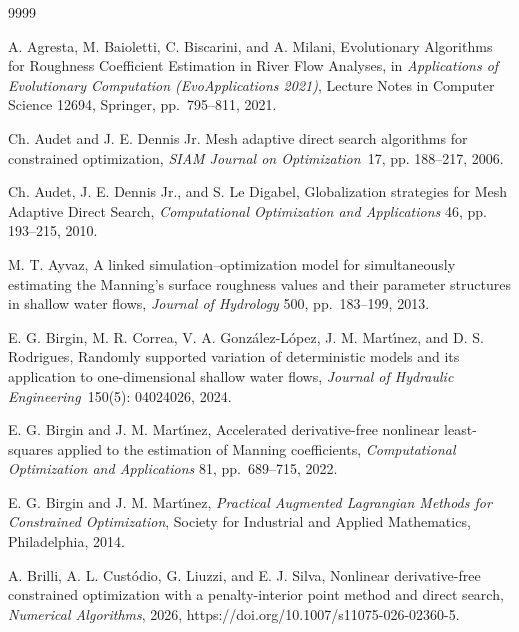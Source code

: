 \documentclass{article}
\begin{document}
    
\begin{thebibliography}{9999}

 

 A. Agresta, M. Baioletti, C. Biscarini, and A. Milani, Evolutionary Algorithms
 for Roughness Coefficient Estimation in River Flow Analyses, in {\it Applications of Evolutionary
 Computation (EvoApplications 2021)}, Lecture Notes in Computer Science 12694, Springer,
 pp.~795--811, 2021.
%
%

 Ch. Audet and J. E. Dennis Jr. {Mesh adaptive direct search algorithms 
for constrained optimization,} {\it SIAM Journal on Optimization}~17, pp. 188--217, 2006.
%

 Ch. Audet, J. E. Dennis Jr., 
and S. Le Digabel, {Globalization strategies for Mesh
 Adaptive Direct Search},  {\it Computational Optimization and Applications} 46,
 pp. 193--215, 2010.
%

  M. T. Ayvaz, A linked simulation–optimization model for simultaneously estimating 
the Manning’s surface roughness values and their parameter structures in shallow water flows, {\it Journal of Hydrology} 500, pp.~183--199, 2013.  

    E. G. Birgin, M. R. Correa, V. A. González-López, J. M.  Mart\'{\i}nez, and D. S. Rodrigues,
 Randomly supported variation of deterministic models and its application to one-dimensional shallow
water flows, {\it Journal of Hydraulic Engineering}~150(5): 04024026, 2024.

 E. G. Birgin and J. M. Mart\'{\i}nez, Accelerated derivative-free
 nonlinear least-squares applied to the estimation of Manning coefficients, {\it Computational
 Optimization and Applications} 81, pp.~689--715, 2022.


  E. G. Birgin and J. M. Mart\'{\i}nez,
  \textit{Practical Augmented Lagrangian Methods for Constrained
    Optimization}, Society for Industrial and Applied Mathematics,
  Philadelphia, 2014.

 A. Brilli, A. L. Cust\'odio, G. Liuzzi, and E. J. Silva,
   Nonlinear derivative-free constrained optimization with a penalty-interior point method and
   direct search, {\it Numerical Algorithms}, 2026, https://doi.org/10.1007/s11075-026-02360-5.


\end{thebibliography}
\end{document}
